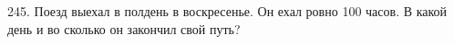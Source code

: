 245. Поезд выехал в полдень в воскресенье. Он ехал ровно 100 часов. В какой день и во сколько он закончил свой путь?\\
